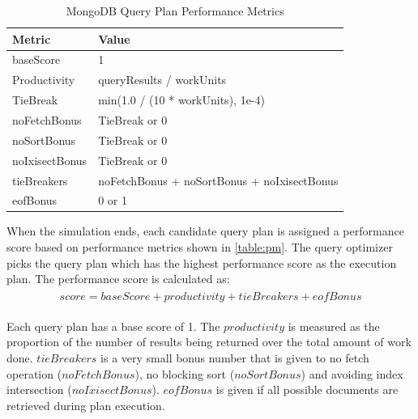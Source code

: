 \begin{table}[htb]
    \begin{tabular}{ll}
        \toprule
        Metric         & Value\\
        \midrule
        baseScore      & 1                                           \\
        Productivity   & queryResults / workUnits                    \\
        TieBreak       & min(1.0 / (10 * workUnits), 1e-4)           \\
        noFetchBonus   & TieBreak or 0                               \\
        noSortBonus    & TieBreak or 0                               \\
        noIxisectBonus & TieBreak or 0                               \\
        tieBreakers    & noFetchBonus + noSortBonus + noIxisectBonus \\
        eofBonus       & 0 or 1\\
        \bottomrule
    \end{tabular}
    \caption{MongoDB Query Plan Performance Metrics}
    \label{table:pm}
\end{table}

When the simulation ends, each candidate query plan is assigned a performance score based on performance metrics shown in \autoref{table:pm}. The query optimizer picks the query plan which has the highest performance score as the execution plan. The performance score is calculated as:
\begin{align}
\begin{split}
 score = baseScore + productivity + tieBreakers + eofBonus
 \end{split}
\end{align}

Each query plan has a base score of 1. The $productivity$ is measured as the proportion of the number of results being returned over the total amount of work done. $tieBreakers$ is a very small bonus number that is given to no fetch operation ($noFetchBonus$), no blocking sort ($noSortBonus$) and avoiding index intersection ($noIxisectBonus$). $eofBonus$ is given if all possible documents are retrieved during plan execution.